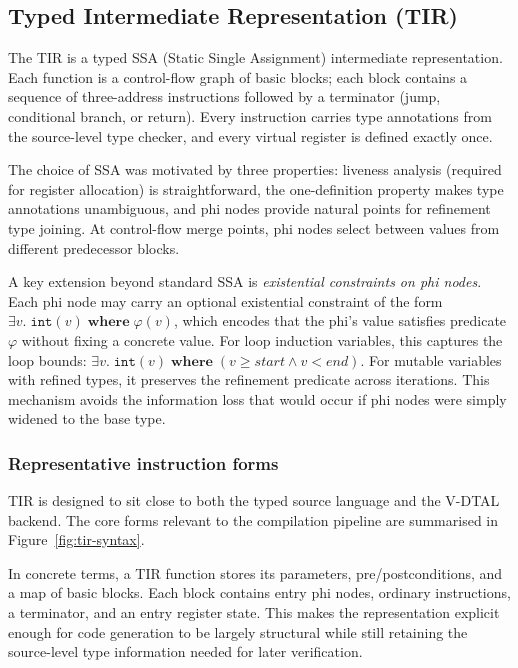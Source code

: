 \subsection{Typed Intermediate Representation (TIR)}

The TIR is a typed SSA (Static Single Assignment) intermediate representation. Each function is a control-flow graph of basic blocks; each block contains a sequence of three-address instructions followed by a terminator (jump, conditional branch, or return). Every instruction carries type annotations from the source-level type checker, and every virtual register is defined exactly once.

The choice of SSA was motivated by three properties: liveness analysis (required for register allocation) is straightforward, the one-definition property makes type annotations unambiguous, and phi nodes provide natural points for refinement type joining. At control-flow merge points, phi nodes select between values from different predecessor blocks.

A key extension beyond standard SSA is \textit{existential constraints on phi nodes}. Each phi node may carry an optional existential constraint of the form $\exists v.\; \mathtt{int}(v) \;\mathbf{where}\; \varphi(v)$, which encodes that the phi's value satisfies predicate $\varphi$ without fixing a concrete value. For loop induction variables, this captures the loop bounds: $\exists v.\; \mathtt{int}(v) \;\mathbf{where}\; (v \ge \mathit{start} \wedge v < \mathit{end})$. For mutable variables with refined types, it preserves the refinement predicate across iterations. This mechanism avoids the information loss that would occur if phi nodes were simply widened to the base type.

\subsubsection{Representative instruction forms}

TIR is designed to sit close to both the typed source language and the V-DTAL backend. The core forms relevant to the compilation pipeline are summarised in Figure~\ref{fig:tir-syntax}.

In concrete terms, a TIR function stores its parameters, pre/postconditions, and a map of basic blocks. Each block contains entry phi nodes, ordinary instructions, a terminator, and an entry register state. This makes the representation explicit enough for code generation to be largely structural while still retaining the source-level type information needed for later verification.

